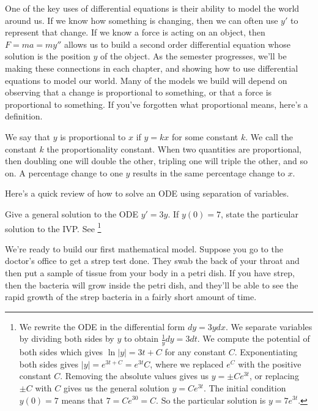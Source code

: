 One of the key uses of differential equations is their ability to model the world around us. 
If we know how something is changing, then we can often use $y'$ to represent that change.  
If we know a force is acting on an object, then $F=ma = my''$ allows us to build a second order differential equation whose solution is the position $y$ of the object.
As the semester progresses, we'll be making these connections in each chapter, and showing how to use differential equations to model our world.  
Many of the models we build will depend on observing that a change is proportional to something, or that a force is proportional to something. If you've forgotten what proportional means, here's a definition.

\begin{definition}[Proportional]
% 
We say that $y$ is proportional to $x$ if $y=kx$ for some constant $k$. We call the constant $k$ the proportionality constant. When two quantities are proportional, then doubling one will double the other, tripling one will triple the other, and so on. A percentage change to one $y$ results in the same percentage change to $x$.
\end{definition}

Here's a quick review of how to solve an ODE using separation of variables.
\begin{review*}
 Give a general solution to the ODE $y'=3y$. If $y(0)=7$, state the particular solution to the IVP. See
\footnote{
We rewrite the ODE in the differential form $dy=3ydx$. We separate variables by dividing both sides by $y$ to obtain $\frac{1}{y}dy = 3dt$. We compute the potential of both sides which gives $\ln |y| =3t+C$ for any constant $C$.  Exponentiating both sides gives $|y| = e^{3t+C} = e^{3t}C$, where we replaced $e^C$ with the positive constant $C$. Removing the absolute values gives us $y = \pm Ce^{3t}$, or replacing $\pm C$ with $C$ gives us the general solution $y=Ce^{3t}$. The initial condition $y(0)=7$ means that $7=Ce^{30} = C$. So the particular solution is $y=7e^{3t}$. 
}
\end{review*}



We're ready to build our first mathematical model.
Suppose you go to the doctor's office to get a strep test done.  They swab the back of your throat and then put a sample of tissue from your body in a petri dish.  If you have strep, then the bacteria will grow inside the petri dish, and they'll be able to see the rapid growth of the strep bacteria in a fairly short amount of time. 




